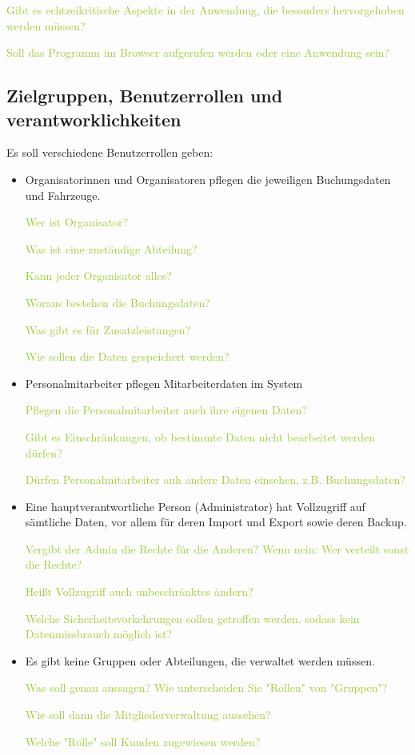 \textcolor{YellowGreen}{Gibt es echtzeikritische Aspekte in der Anwendung, die besonders hervorgehoben werden müssen?}

\textcolor{YellowGreen}{Soll das Programm im Browser aufgerufen werden oder eine Anwendung sein?}


\subsection{Zielgruppen, Benutzerrollen und verantworklichkeiten}

Es soll verschiedene Benutzerrollen geben: 

\begin{itemize}
    \item Organisatorinnen und Organisatoren pflegen die jeweiligen Buchungsdaten und Fahrzeuge. 
    
    \textcolor{YellowGreen}{Wer ist Organisator?}

    \textcolor{YellowGreen}{Was ist eine zuständige Abteilung?}

    \textcolor{YellowGreen}{Kann jeder Organisator alles?}

    \textcolor{YellowGreen}{Woraus bestehen die Buchungsdaten?}

    \textcolor{YellowGreen}{Was gibt es für Zusatzleistungen?}

    \textcolor{YellowGreen}{Wie sollen die Daten gespeichert werden?}

    \item Personalmitarbeiter pflegen Mitarbeiterdaten im System  
    
    \textcolor{YellowGreen}{Pflegen die Personalmitarbeiter auch ihre eigenen Daten?}

    \textcolor{YellowGreen}{Gibt es Einschränkungen, ob bestimmte Daten nicht bearbeitet werden dürfen?}

    \textcolor{YellowGreen}{Dürfen Personalmitarbeiter auh andere Daten einsehen, z.B. Buchungsdaten?}

    \item Eine hauptverantwortliche Person (Administrator) hat Vollzugriff auf sämtliche Daten, vor allem für deren Import und Export sowie deren Backup. 
    
    \textcolor{YellowGreen}{Vergibt der Admin die Rechte für die Anderen? Wenn nein: Wer verteilt sonst die Rechte?}

    \textcolor{YellowGreen}{Heißt Vollzugriff auch unbeschränktes ändern?}

    \textcolor{YellowGreen}{Welche Sicherheitsvorkehrungen sollen getroffen werden, sodass kein Datenmissbrauch möglich ist?}

    \item Es gibt keine Gruppen oder Abteilungen, die verwaltet werden müssen.
    
    \textcolor{YellowGreen}{Was soll genau aussagen? Wie unterscheiden Sie "Rollen" von "Gruppen"?}

    \textcolor{YellowGreen}{Wie soll dann die Mitgliederverwaltung aussehen?}

    \textcolor{YellowGreen}{Welche "Rolle" soll Kunden zugewiesen werden?}
\end{itemize}

